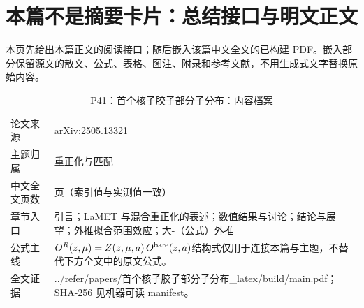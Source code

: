 \documentclass[UTF8,11pt,oneside]{ctexbook}
\begin{document}
\section*{本篇不是摘要卡片：总结接口与明文正文}
本页先给出本篇正文的阅读接口；随后嵌入该篇中文全文的已构建 PDF。嵌入部分保留源文的散文、公式、表格、图注、附录和参考文献，不用生成式文字替换原始内容。
\begin{table}[htbp]
  \centering
  \caption{P41：首个核子胶子部分子分布：内容档案}
  \small
  \begin{tabularx}{0.96\textwidth}{@{}p{3.3cm}>{\raggedright\arraybackslash}X@{}}
    \toprule
    论文来源 & arXiv:2505.13321 \\
    主题归属 & 重正化与匹配 \\
    中文全文页数 & 15 页（索引值与实测值一致） \\
    章节入口 & 引言；LaMET 与混合重正化的表述；数值结果与讨论；结论与展望；外推拟合范围效应；大-（公式）外推 \\
    公式主线 & $O^{R}(z,\mu)=Z(z,\mu,a)\,O^{\rm bare}(z,a)$\newline\scriptsize 结构式仅用于连接本篇与主题，不替代下方全文中的原文公式。 \\
    全文证据 & ../\allowbreak{}refer/\allowbreak{}papers/\allowbreak{}首个核子胶子部分子分布\_\allowbreak{}latex/\allowbreak{}build/\allowbreak{}main.pdf；SHA-256 见机器可读 manifest。 \\
    \bottomrule
  \end{tabularx}
\end{table}
\end{document}
